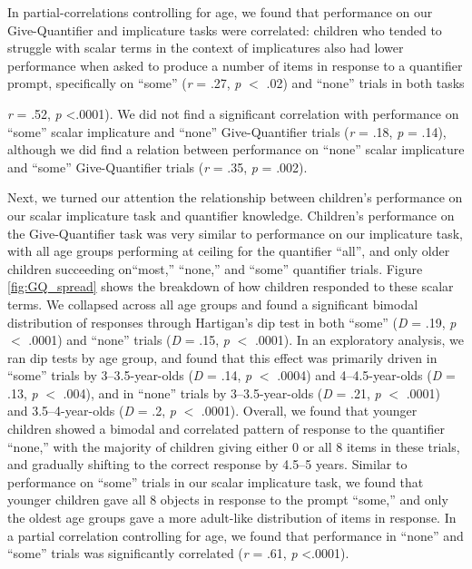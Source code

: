 \documentclass[man]{apa2}
\begin{document}
In partial-correlations controlling for age, we found that performance on our Give-Quantifier and implicature tasks were correlated: children who tended to struggle with scalar terms in the context of implicatures also had lower performance when asked to produce a number of items in response to a quantifier prompt, specifically on ``some''  (\textit{r} = .27, \textit{p} $<$ .02) and ``none'' trials in both tasks {\textit{r} = .52, \textit{p} \textless .0001). We did not find a significant correlation with performance on ``some'' scalar implicature and ``none'' Give-Quantifier trials (\textit{r} = .18, \textit{p} = .14), although we did find a relation between performance on ``none'' scalar implicature and ``some'' Give-Quantifier trials (\textit{r} = .35, \textit{p} = .002). 

Next, we turned our attention the relationship between children's performance on our scalar implicature task and quantifier knowledge. Children's performance on the Give-Quantifier task was very similar to performance on our implicature task, with all age groups performing at ceiling for the quantifier ``all'', and only older children succeeding on``most,'' ``none,'' and ``some'' quantifier trials. Figure \ref{fig:GQ_spread} shows the breakdown of how children responded to these scalar terms. We collapsed across all age groups and found a significant bimodal distribution of responses through Hartigan's dip test in both ``some'' (\emph{D} = .19, \emph{p} $<$ .0001) and ``none'' trials (\emph{D} = .15, \emph{p} $<$ .0001). In an exploratory analysis, we ran dip tests by age group, and found that this effect was primarily driven in ``some'' trials by 3--3.5-year-olds (\emph{D} = .14, \emph{p} $<$ .0004) and 4--4.5-year-olds (\emph{D} = .13, \emph{p} $<$ .004), and in ``none'' trials by 3--3.5-year-olds (\emph{D} = .21, \emph{p} $<$ .0001) and 3.5--4-year-olds (\emph{D} = .2, \emph{p} $<$ .0001). Overall, we found that younger children showed a bimodal and correlated pattern of response to the quantifier ``none,'' with the majority of children giving either 0 or all 8 items in these trials, and gradually shifting to the correct response by 4.5--5 years. Similar to performance on ``some'' trials in our scalar implicature task, we found that younger children gave all 8 objects in response to the prompt ``some,'' and only the oldest age groups gave a more adult-like distribution of items in response. In a partial correlation controlling for age, we found that performance in ``none'' and ``some'' trials was significantly correlated (\textit{r} = .61, \textit{p} \textless .0001). 

}
\end{document}
